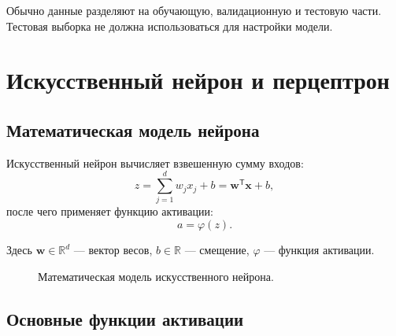 \documentclass[12pt,a4paper]{article}
\theoremstyle{definition}
\newcommand{\R}{\mathbb{R}}
\newcommand{\T}{\mathsf{T}}
\newcommand{\1}{\mathbf{1}}
\begin{document}
Обычно данные разделяют на обучающую, валидационную и тестовую части.
Тестовая выборка не должна использоваться для настройки модели.

\section{Искусственный нейрон и перцептрон}

\subsection{Математическая модель нейрона}

Искусственный нейрон вычисляет взвешенную сумму входов:
\[
    z
    =
    \sum_{j=1}^{d}w_jx_j+b
    =
    \bm{w}^{\T}\bm{x}+b,
\]
после чего применяет функцию активации:
\[
    a=\varphi(z).
\]

Здесь $\bm{w}\in\R^d$ --- вектор весов, $b\in\R$ --- смещение,
$\varphi$ --- функция активации.

\begin{figure}[h]
\centering
{}
\caption{Математическая модель искусственного нейрона.}
\end{figure}

\subsection{Основные функции активации}
\end{document}
